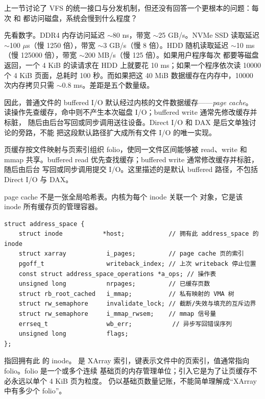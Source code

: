 \begin{filesystemlayout}




上一节讨论了 VFS 的统一接口与分发机制，但还没有回答一个更根本的问题：每次  和  都访问磁盘，系统会慢到什么程度？

先看数字。DDR4 内存访问延迟 $\sim$80 ns，带宽 $\sim$25 GB/s。NVMe SSD 读取延迟 $\sim$100 $\mu$s（慢 1250 倍），带宽 $\sim$3 GB/s（慢 8 倍）。HDD 随机读取延迟 $\sim$10 ms（慢 125000 倍），带宽 $\sim$200 MB/s（慢 125 倍）。如果用户程序每次  都要等磁盘返回，一个 4 KiB 的读请求在 HDD 上就要花 10 ms；如果一个程序依次读 10000 个 4 KiB 页面，总耗时 100 秒。而如果把这 40 MiB 数据缓存在内存中，10000 次内存拷贝只需 $\sim$0.8 ms。差距是五个数量级。

因此，普通文件的 buffered I/O 默认经过内核的文件数据缓存——\emph{page cache}。
读操作先查缓存，命中则不产生本次磁盘 I/O；buffered write 通常先修改缓存并标脏，
随后由后台写回或同步调用送往设备。Direct I/O 和 DAX 是后文单独讨论的旁路，不能
把这段默认路径扩大成所有文件 I/O 的唯一实现。

页缓存按文件映射与页索引组织 folio，使同一文件区间能够被 read、write 和 mmap
共享。buffered read 优先查找缓存；buffered write 通常修改缓存并标脏，随后由后台
写回或同步调用提交 I/O。这里描述的是默认 buffered 路径，不包括 Direct I/O 与 DAX。


page cache 不是一张全局哈希表。内核为每个 inode 关联一个  对象，它是该 inode 所有缓存页的管理容器。

\begin{lstlisting}
struct address_space {
    struct inode           *host;            // 拥有此 address_space 的 inode
    struct xarray           i_pages;         // page cache 页的索引
    pgoff_t                 writeback_index; // 上次 writeback 停止位置
    const struct address_space_operations *a_ops; // 操作表
    unsigned long           nrpages;         // 已缓存页数
    struct rb_root_cached   i_mmap;          // 私有映射的 VMA 树
    struct rw_semaphore     invalidate_lock; // 截断/失效与填充的互斥边界
    struct rw_semaphore     i_mmap_rwsem;    // mmap 信号量
    errseq_t                wb_err;           // 异步写回错误序列
    unsigned long           flags;
};
\end{lstlisting}

 指回拥有此  的 inode。 是
XArray 索引，键表示文件中的页索引，值通常指向 folio。folio 是一个或多个连续
基础页的内存管理单位；引入它是为了让页缓存不必永远以单个 4 KiB 页为粒度。
 仍以基础页数量记账，不能简单理解成“XArray 中有多少个 folio”。


\end{filesystemlayout}
